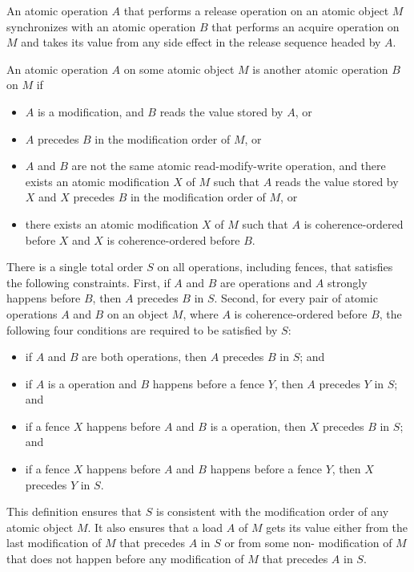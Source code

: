 \pnum
An atomic operation $A$ that performs a release operation on an atomic
object $M$ synchronizes with an atomic operation $B$ that performs
an acquire operation on $M$ and takes its value from any side effect in the
release sequence headed by $A$.

\pnum
An atomic operation $A$ on some atomic object $M$ is
another atomic operation $B$ on $M$ if
\begin{itemize}
\item $A$ is a modification, and
$B$ reads the value stored by $A$, or
\item $A$ precedes $B$
in the modification order of $M$, or
\item $A$ and $B$ are not
the same atomic read-modify-write operation, and
there exists an atomic modification $X$ of $M$
such that $A$ reads the value stored by $X$ and
$X$ precedes $B$
in the modification order of $M$, or
\item there exists an atomic modification $X$ of $M$
such that $A$ is coherence-ordered before $X$ and
$X$ is coherence-ordered before $B$.
\end{itemize}

\pnum
There is a single total order $S$
on all  operations, including fences,
that satisfies the following constraints.
First, if $A$ and $B$ are
 operations and
$A$ strongly happens before $B$,
then $A$ precedes $B$ in $S$.
Second, for every pair of atomic operations $A$ and
$B$ on an object $M$,
where $A$ is coherence-ordered before $B$,
the following four conditions are required to be satisfied by $S$:
\begin{itemize}
\item if $A$ and $B$ are both
 operations,
then $A$ precedes $B$ in $S$; and
\item if $A$ is a  operation and
$B$ happens before
a  fence $Y$,
then $A$ precedes $Y$ in $S$; and
\item if a  fence $X$
happens before $A$ and
$B$ is a  operation,
then $X$ precedes $B$ in $S$; and
\item if a  fence $X$
happens before $A$ and
$B$ happens before
a  fence $Y$,
then $X$ precedes $Y$ in $S$.
\end{itemize}

\pnum
\begin{note}
This definition ensures that $S$ is consistent with
the modification order of any atomic object $M$.
It also ensures that
a  load $A$ of $M$
gets its value either from the last modification of $M$
that precedes $A$ in $S$ or
from some non- modification of $M$
that does not happen before any modification of $M$
that precedes $A$ in $S$.
\end{note}

